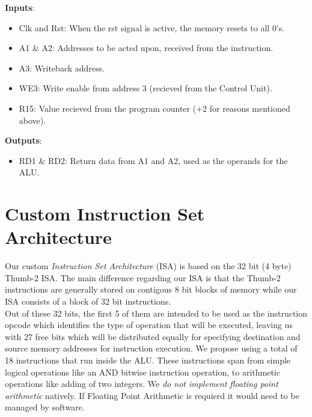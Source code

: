 \documentclass[9pt,a4paper,twoside]{tau}
\begin{document}
    \textbf{Inputs}:
    \begin{itemize}
        \item Clk and Rst: When the rst signal is active, the memory resets to all 0's.
        \item A1 \& A2: Addresses to be acted upon, received from the instruction.
        \item A3: Writeback address.
        \item WE3: Write enable from address 3 (recieved from the Control Unit).
        \item R15: Value recieved from the program counter (+2 for reasons mentioned above).
    \end{itemize}
    
    \textbf{Outputs}:
    \begin{itemize}
    \item RD1 \& RD2: Return data from A1 and A2, used as the operands for the ALU.
    \end{itemize}
    



        \section{Custom Instruction Set Architecture}

        Our custom \textit{Instruction Set Architecture} (ISA) is based on the 32 bit (4 byte) Thumb-2 ISA. The main difference regarding our ISA is that the Thumb-2 instructions are generally stored on contigous 8 bit blocks of memory while our ISA consists of a block of 32 bit instructions.\\

        Out of these 32 bits, the first 5 of them are intended to be used as the instruction opcode which identifies the type of operation that will be executed, leaving us with 27 free bits which will be distributed equally for specifying destination and source memory addresses for instruction execution. 
        We propose using a total of 18 instructions that run inside the ALU. These instructions span from simple logical operations like an AND bitwise instruction operation, to arithmetic operations like adding of two integers. We \textit{do not implement floating point arithmetic} natively. If Floating Point Arithmetic is requierd it would need to be managed by software. 
\end{document}
